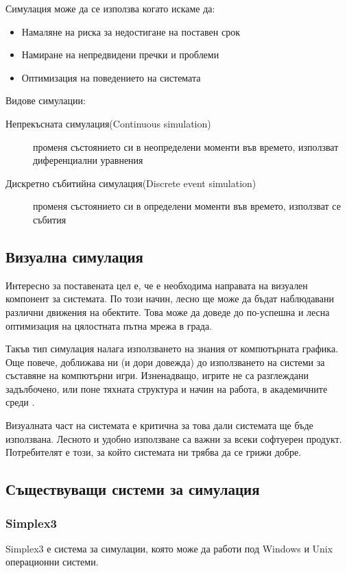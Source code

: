 		Симулация може да се използва когато искаме да:
		
		\begin{itemize}
		\item Намаляне на риска за недостигане на поставен срок		
 		\item Намиране на непредвидени пречки и проблеми
 		\item Оптимизация на поведението на системата
		\end{itemize}
		
		Видове симулации:
		
		\begin{description}
		\item[Непрекъсната симулация(Continuous simulation)] променя състоянието си в неопределени моменти във времето, използват диференциални уравнения
		\item[Дискретно събитийна симулация(Discrete event simulation)] променя състоянието си в определени моменти във времето, използват се събития
		\end{description}
		
	\subsection{Визуална симулация}
		Интересно за поставената цел е, че е необходима направата на визуален компонент за системата.
		По този начин, лесно ще може да бъдат наблюдавани различни движения на обектите. Това може да 
		доведе до по-успешна и лесна оптимизация на цялостната пътна мрежа в града.
		
		Такъв тип симулация налага използването на знания от компютърната графика. 
		Още повече, доближава ни (и дори довежда) до използването на системи за съставяне на компютърни игри. 
		Изненадващо, игрите не са разглеждани задълбочено, или поне тяхната структура и начин на работа, в академичните среди \cite{Holzkorn}.
		
		Визуалната част на системата е критична за това дали системата ще бъде използвана.
		Лесното и удобно използване са важни за всеки софтуерен продукт. 
		Потребителят е този, за който системата ни трябва да се грижи добре. \cite{Microsoft}
	
	\subsection{Съществуващи системи за симулация}
		\subsubsection{Simplex3}
			Simplex3 е система за симулации, която може да работи под Windows и Unix операционни системи.
			
